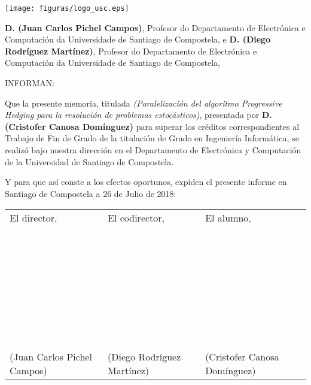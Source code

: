 \pagestyle{plain}
\texttt{[image: figuras/logo\_usc.eps]}

\vspace{1cm}
{\bf D. (Juan Carlos Pichel Campos)}, Profesor do Departamento de Electrónica e Computación da Universidade de Santiago de Compostela, e {\bf D. (Diego Rodríguez Martínez)}, Profesor do Departamento de Electrónica e Computación da Universidade de Santiago de Compostela,

\vspace{1cm}
INFORMAN:

\vspace{1cm}
Que la presente memoria, titulada {\it (Paralelización del algoritmo Progressive Hedging para la resolución de problemas estocásticos)}, presentada por {\bf D. (Cristofer Canosa Domínguez)} para superar los créditos correspondientes al Trabajo de Fin de Grado de la titulación de Grado en Ingeniería Informática, se realizó bajo nuestra dirección en el Departamento de Electrónica y Computación de la Universidad de Santiago de Compostela.

\vspace{1cm}
Y para que así conste a los efectos oportunos, expiden el presente informe en Santiago de Compostela a 26 de Julio de 2018:

\vspace{2cm}
\begin{tabular}{lll}
El director, & El codirector, & El alumno, \\
~ \\
~ \\
~ \\
~ \\
~ \\
~ \\
~ \\
(Juan Carlos Pichel Campos) & (Diego Rodríguez Martínez) & (Cristofer Canosa Domínguez)
\end{tabular}

